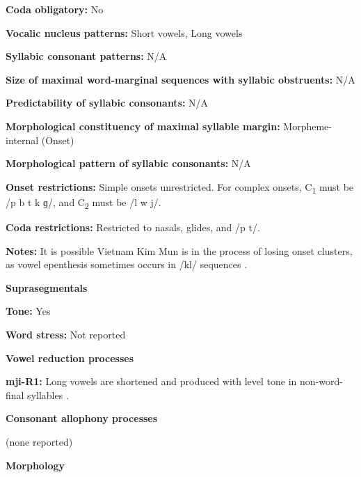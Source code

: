 \textbf{Coda obligatory:} No



\textbf{Vocalic nucleus patterns:} Short vowels, Long vowels



\textbf{Syllabic consonant patterns:} N/A



\textbf{Size of maximal word{}-marginal sequences with syllabic obstruents:} N/A



\textbf{Predictability of syllabic consonants:} N/A



\textbf{Morphological constituency of maximal syllable margin:} Morpheme-internal (Onset)



\textbf{Morphological pattern of syllabic consonants:} N/A



\textbf{Onset restrictions:} Simple onsets unrestricted. For complex onsets, C\textsubscript{1} must be /p b t k ɡ/, and C\textsubscript{2} must be /l w j/. 



\textbf{Coda restrictions:} Restricted to nasals, glides, and /p t/.



\textbf{Notes:} It is possible Vietnam Kim Mun is in the process of losing onset clusters, as vowel epenthesis sometimes occurs in /kl/ sequences \citep[127]{Clark2008}.



\textbf{Suprasegmentals}



\textbf{Tone:} Yes



\textbf{Word stress:} Not reported



\textbf{Vowel reduction processes}



\textbf{mji-R1:} Long vowels are shortened and produced with level tone in non-word-final syllables \citep[117]{Clark2008}.



\textbf{Consonant allophony processes}



(none reported)



\textbf{Morphology}



